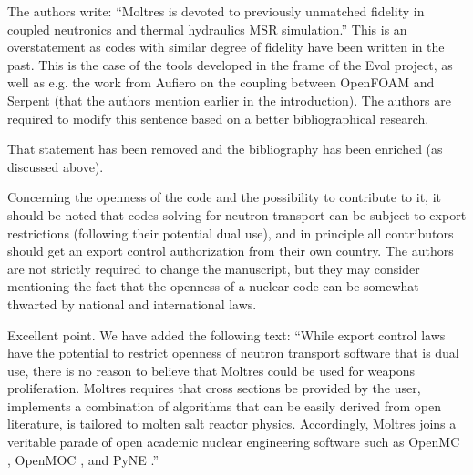 \documentclass[answers,11pt]{exam}
\begin{document}
\begin{questions}
\question The authors write: ``Moltres is devoted to previously unmatched
fidelity in coupled neutronics and thermal hydraulics MSR simulation.''  This is
an overstatement as codes with similar degree of fidelity have been written in
the past. This is the case of the tools developed in the frame of the Evol
project, as well as e.g. the work from Aufiero on the coupling between OpenFOAM
and Serpent (that the authors mention earlier in the introduction). The authors
are required to modify this sentence based on a better bibliographical research.
\begin{solution}
        That statement has been removed and the bibliography has been enriched
        (as discussed above).
\end{solution}

\question Concerning the openness of the code and the possibility to contribute
to it, it should be noted that codes solving for neutron transport can be
subject to export restrictions (following their potential dual use), and in
principle all contributors should get an export control authorization from their
own country. The authors are not strictly required to change the manuscript, but
they may consider mentioning the fact that the openness of a nuclear code can be
somewhat thwarted by national and international laws.
\begin{solution}
	Excellent point. We have added the following text: ``While export
control laws have the potential to restrict openness of neutron transport
software that is dual use, there is no reason to believe that Moltres could be
used for weapons proliferation.  Moltres requires that cross sections be
provided by the user, implements a combination of algorithms that can be easily
derived from open literature, is tailored to molten salt reactor physics.
Accordingly, Moltres joins a veritable parade of open academic nuclear
engineering software such as OpenMC \cite{romano_openmc:_2015},
OpenMOC \cite{boyd_openmoc_2014}, and
PyNE \cite{bates_pyne_2014,biondo_quality_2014}.''

\end{solution}


\end{questions}
\end{document}
